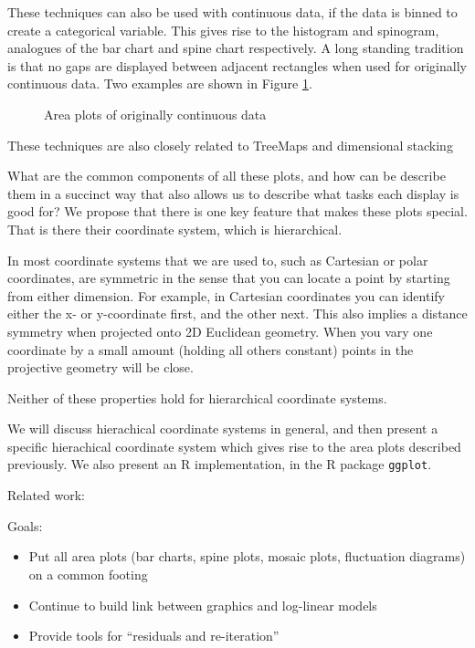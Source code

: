 \documentclass[letterpaper,oneside]{scrartcl}
\begin{document}
These techniques can also be used with continuous data, if the data is binned to create a categorical variable.  This gives rise to the histogram and spinogram, analogues of the bar chart and spine chart respectively.  A long standing tradition is that no gaps are displayed between adjacent rectangles when used for originally continuous data.  Two examples are shown in Figure \ref{fig:cont-examples}.

\begin{figure}[htbp]
  \begin{center}
  \end{center}
  \caption{Area plots of originally continuous data}
  \label{fig:cont-examples}
\end{figure}

These techniques are also closely related to TreeMaps and dimensional stacking \citep{leblanc:1990}

What are the common components of all these plots, and how can be describe them in a succinct way that also allows us to describe what tasks each display is good for?  We propose that there is one key feature that makes these plots special.  That is there their coordinate system, which is hierarchical.  

In most coordinate systems that we are used to, such as Cartesian or polar coordinates, are symmetric in the sense that you can locate a point by starting from either dimension.  For example, in Cartesian coordinates you can identify either the x- or y-coordinate first, and the other next.  This also implies a distance symmetry when projected onto 2D Euclidean geometry. When you vary one coordinate by a small amount (holding all others constant) points in the projective geometry will be close.

Neither of these properties hold for hierarchical coordinate systems. 

We will discuss hierachical coordinate systems in general, and then present a specific hierachical coordinate system which gives rise to the area plots described previously.  We also present an R implementation, in the R package {\tt ggplot}.

Related work:

\citep{vliegen:2006}
\citep{ahlberg:1996}


\citep{hartigan:1984,hartigan:1981}
\citep{friendly:1999,friendly:1994}
\citep{theus:1999}
\citep{hofmann:2000,hofmann:2001,hofmann:2003}

Goals:

\begin{itemize}
  \item Put all area plots (bar charts, spine plots, mosaic plots, fluctuation diagrams) on a common footing
  \item Continue to build link between graphics and log-linear models
  \item Provide tools for ``residuals and re-iteration''
\end{itemize}  
\end{document}
